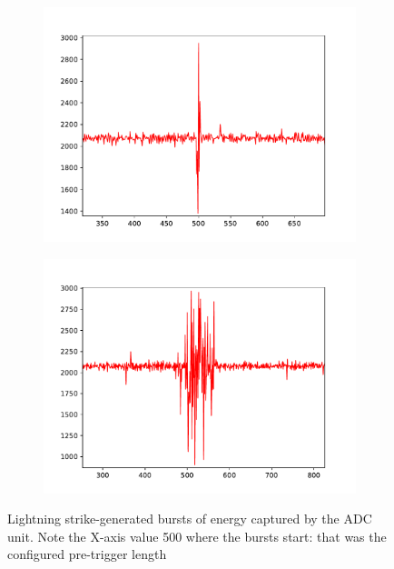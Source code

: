 \begin{figure}[h]
\begin{subfigure}{.5\textwidth}
	\includegraphics[width=\textwidth]{img/strike3}
	\end{subfigure}%
	\begin{subfigure}{.5\textwidth}
	\includegraphics[width=\textwidth]{img/strike4}
	\end{subfigure}
	\caption[Captured lightning strikes]{Lightning strike-generated bursts of energy captured by the ADC unit. Note the X-axis value 500 where the bursts start: that was the configured pre-trigger length}
	\label{fig:strikes}
\end{figure}










